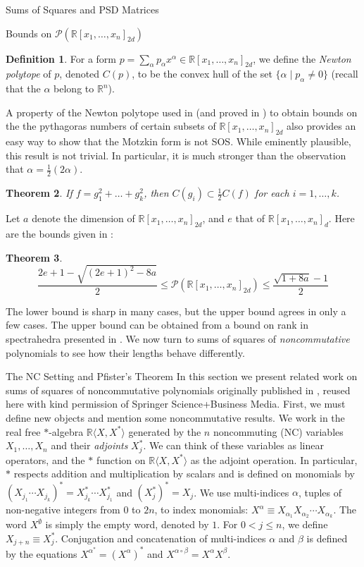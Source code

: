 \documentclass[12pt,oneside,final]{ucthesisucsbmath2010}
\newcommand{\R}{\mathbb{R}}
\newcommand{\p}{\mathcal{P}}
\newcommand{\pnd}{\R[x_1,\ldots,x_n]_{2d}}
\newcommand{\pn}{\R[x_1,\ldots,x_n]}
\newtheorem{thm}{Theorem}[section]
\theoremstyle{definition}
\newtheorem{defn}[thm]{Definition}
\begin{document}
\begin{chapter}{Sums of Squares and PSD Matrices}
\begin{section}{Bounds on $\p(\pnd)$}
\begin{defn}For a form $ p= \sum_\alpha p_\alpha x^\alpha \in \pnd$, we define the \emph{Newton polytope} of $p$, denoted $C(p)$, to be the convex hull of the set $\{\alpha \mid p_\alpha \neq 0\}$ (recall that the $\alpha$ belong to $\R^n$).
\end{defn}

A property of the Newton polytope used in \cite{RezChoiLam} (and proved in \cite{RezNewt}) to obtain bounds on the the pythagoras numbers of certain subsets of $\pnd$ also provides an easy way to show that the Motzkin form is not SOS. While eminently plausible, this result is not trivial. In particular, it is much stronger than the observation that $\alpha = \tfrac{1}{2}(2\alpha)$.

\begin{thm}If $f =g_1^2+\ldots+g_k^2$, then $C(g_i) \subset \tfrac{1}{2}C(f)$ for each $i = 1,\ldots,k$.
 \label{NewtLatt}
 \end{thm}

Let $a$ denote the dimension of $\pnd$, and $e$ that of $\pn_d$. Here are the bounds given in \cite{RezChoiLam}:

\begin{thm} 
\[\frac{2e+1-\sqrt{(2e+1)^2-8a}}{2} \leq \p(\pnd) \leq \frac{\sqrt{1+8a}-1}{2}\]
\end{thm}
The lower bound is sharp in many cases, but the upper bound agrees in only a few cases. The upper bound can be obtained from a bound on rank in spectrahedra presented in \cite{Barvinok}. We now turn to sums of squares of \emph{noncommutative} polynomials to see how their lengths behave differently.
\label{pythy}
\end{section}


\begin{section}{The NC Setting and Pfister's Theorem}
In this section we present related work on sums of squares of noncommutative polynomials originally published in \cite{billbook}, reused here with kind permission of Springer Science+Business Media. First, we must define new objects and mention some noncommutative results.  We work in the real free $\ast$-algebra $\R\langle X, X^* \rangle$ generated by the $n$ noncommuting (NC) variables $X_1, \ldots, X_n$ and their \emph{adjoints} $X_j^*$.  We can think of these variables as linear operators, and the $\ast$ function on $\R\langle X, X^* \rangle$ as the adjoint operation.  In particular, $\ast$ respects addition and multiplication by scalars and is defined on monomials by $(X_{j_1} \cdots X_{j_k}) ^*= X_{j_k}^* \cdots X_{j_1}^*$ and $(X_j^*)^*=X_j$.  We use multi-indices $\alpha$, tuples of non-negative integers from $0$ to $2n$, to index monomials: $X^\alpha \equiv X_{\alpha_1}X_{\alpha_2} \cdots X_{\alpha_k}$. The word $X^\emptyset$ is simply the empty word, denoted by $1$.  For $0<j\leq n$, we define $X_{j+n} \equiv X_j^*$.  Conjugation and concatenation of multi-indices $\alpha$ and $\beta$ is defined by the equations $X^{\alpha^*}=(X^\alpha)^*$ and $X^{\alpha \circ \beta}  = X^{\alpha} X^{\beta}$.


\end{section}
\end{chapter}
\end{document}
